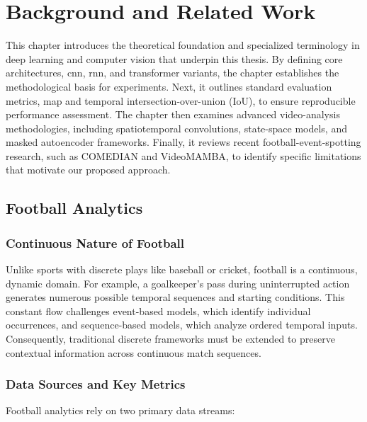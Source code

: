 \chapter{Background and Related Work}
\label{chap:background}

This chapter introduces the theoretical foundation and specialized terminology in deep learning and computer vision that underpin this thesis. By defining core architectures, \acrlong{cnn}, \acrlong{rnn}, and transformer variants, the chapter establishes the methodological basis for experiments. Next, it outlines standard evaluation metrics, \acrfull{map} and temporal intersection-over-union (IoU), to ensure reproducible performance assessment. The chapter then examines advanced video-analysis methodologies, including spatiotemporal convolutions, state-space models, and masked autoencoder frameworks. Finally, it reviews recent football-event-spotting research, such as COMEDIAN and VideoMAMBA, to identify specific limitations that motivate our proposed approach.

\section{Football Analytics}
\label{sec:football_analytics}

\subsection{Continuous Nature of Football}
Unlike sports with discrete plays like baseball or cricket, football is a continuous, dynamic domain. For example, a goalkeeper's pass during uninterrupted action generates numerous possible temporal sequences and starting conditions. This constant flow challenges event-based models, which identify individual occurrences, and sequence-based models, which analyze ordered temporal inputs. Consequently, traditional discrete frameworks must be extended to preserve contextual information across continuous match sequences. 

\subsection{Data Sources and Key Metrics}
Football analytics rely on two primary data streams:

